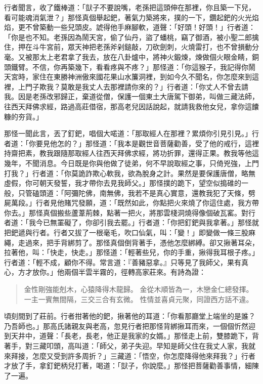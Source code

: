 行者聞言，收了鐵棒道：「獃子不要說嘴，老孫把這頭伸在那裡，你且築一下兒，看可能魂消氣泄？」那怪真個舉起鈀，著氣力築將來，撲的一下，鑽起鈀的火光焰焰，更不曾築動一些兒頭皮。諕得他手麻腳軟，道聲：「好頭！好頭！」行者道：「你是也不知。老孫因為鬧天宮，偷了仙丹，盜了蟠桃，竊了御酒，被小聖二郎擒住，押在斗牛宮前，眾天神把老孫斧剁鎚敲，刀砍劍刺，火燒雷打，也不曾損動分毫。又被那太上老君拿了我去，放在八卦爐中，將神火鍛煉，煉做個火眼金睛，銅頭鐵臂。不信，你再築幾下，看看疼與不疼？」那怪道：「你這猴子，我記得你鬧天宮時，家住在東勝神洲傲來國花果山水簾洞裡，到如今久不聞名，你怎麼來到這裡，上門子欺我？莫敢是我丈人去那裡請你來的？」行者道：「你丈人不曾去請我。因是老孫改邪歸正，棄道從僧，保護一個東土大唐駕下御弟，叫做三藏法師，往西天拜佛求經，路過高莊借宿，那高老兒因話說起，就請我救他女兒，拿你這饢糠的夯貨。」

那怪一聞此言，丟了釘鈀，唱個大喏道：「那取經人在那裡？累煩你引見引見。」行者道：「你要見他怎的？」那怪道：「我本是觀世音菩薩勸善，受了他的戒行，這裡持齋把素，教我跟隨那取經人往西天拜佛求經，將功折罪，還得正果。教我等他這幾年，不聞消息。今日既是你與他做了徒弟，何不早說取經之事，只倚兇強，上門打我？」行者道：「你莫詭詐欺心軟我，欲為脫身之計。果然是要保護唐僧，略無虛假，你可朝天發誓，我才帶你去見我師父。」那怪撲的跪下，望空似搗碓的一般，只管磕頭道：「阿彌陀佛，南無佛，我若不是真心實意，還教我犯了天條，劈屍萬段。」行者見他賭咒發願，道：「既然如此，你點把火來燒了你這住處，我方帶你去。」那怪真個搬些蘆葦荊棘，點著一把火，將那雲棧洞燒得像個破瓦窰。對行者道：「我今已無罣礙了，你卻引我去罷。」行者道：「你把釘鈀與我拿著。」那怪就把鈀遞與行者。行者又拔了一根毫毛，吹口仙氣，叫：「變！」即變做一條三股麻繩，走過來，把手背綁剪了。那怪真個倒背著手，憑他怎麼綁縛。卻又揪著耳朵，拉著他，叫：「快走，快走。」那怪道：「輕著些兒，你的手重，揪得我耳根子疼。」行者道：「輕不成，顧你不得。常言道：『善豬惡拿。』只等見了我師父，果有真心，方才放你。」他兩個半雲半霧的，徑轉高家莊來。有詩為證：
\begin{quote}
金性剛強能剋木，心猿降得木龍歸。
金從木順皆為一，木戀金仁總發揮。
一主一賓無間隔，三交三合有玄微。
性情並喜貞元聚，同證西方話不違。
\end{quote}

頃刻間到了莊前。行者拑著他的鈀，揪著他的耳道：「你看那廳堂上端坐的是誰？乃吾師也。」那高氏諸親友與老高，忽見行者把那怪背綁揪耳而來，一個個忻然迎到天井中，道聲：「長老，長老，他正是我家的女婿。」那怪走上前，雙膝跪下，背著手，對三藏叩頭，高叫道：「師父，弟子失迎。早知是師父住在我丈人家，我就來拜接，怎麼又受到許多周折？」三藏道：「悟空，你怎麼降得他來拜我？」行者才放了手，拿釘鈀柄兒打著，喝道：「獃子，你說麼。」那怪把菩薩勸善事情，細陳了一遍。

